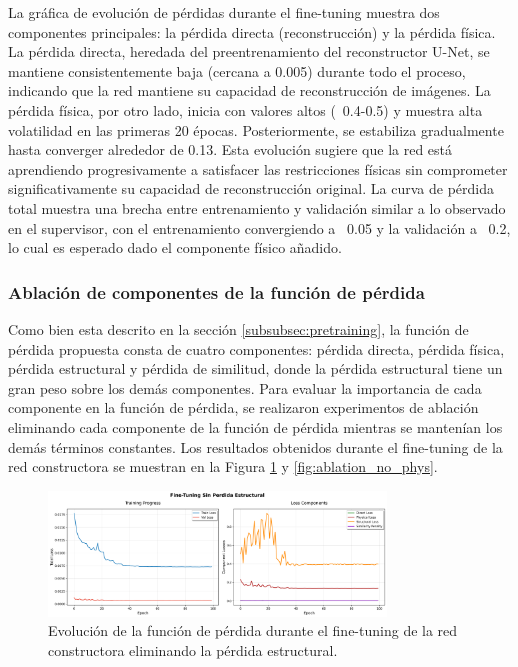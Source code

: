 La gráfica de evolución de pérdidas durante el fine-tuning muestra dos componentes principales: la pérdida directa (reconstrucción) y la pérdida física. La pérdida directa, heredada del preentrenamiento del reconstructor U-Net, se mantiene consistentemente baja (cercana a 0.005) durante todo el proceso, indicando que la red mantiene su capacidad de reconstrucción de imágenes.
La pérdida física, por otro lado, inicia con valores altos (~0.4-0.5) y muestra alta volatilidad en las primeras 20 épocas. Posteriormente, se estabiliza gradualmente hasta converger alrededor de 0.13. Esta evolución sugiere que la red está aprendiendo progresivamente a satisfacer las restricciones físicas sin comprometer significativamente su capacidad de reconstrucción original.
La curva de pérdida total muestra una brecha entre entrenamiento y validación similar a lo observado en el supervisor, con el entrenamiento convergiendo a ~0.05 y la validación a ~0.2, lo cual es esperado dado el componente físico añadido.


\subsubsection{Ablación de componentes de la función de pérdida} \label{subsec:ablation}

Como bien esta descrito en la sección \ref{subsubsec:pretraining}, la función de pérdida propuesta consta de cuatro componentes: pérdida directa, pérdida física, pérdida estructural y pérdida de similitud, donde la pérdida estructural tiene un gran peso sobre los demás componentes. Para evaluar la importancia de cada componente en la función de pérdida, se realizaron experimentos de ablación eliminando cada componente de la función de pérdida mientras se mantenían los demás términos constantes. Los resultados obtenidos durante el fine-tuning de la red constructora se muestran en la Figura \ref{fig:ablation_no_struct} y \ref{fig:ablation_no_phys}.

\begin{figure}[H]
    \centering
    \includegraphics[width=0.8\textwidth]{Images/perdidas_entrenamiento_finetuning_no_struct.png}
    \caption{Evolución de la función de pérdida durante el fine-tuning de la red constructora eliminando la pérdida estructural.}
    \label{fig:ablation_no_struct}
\end{figure}

